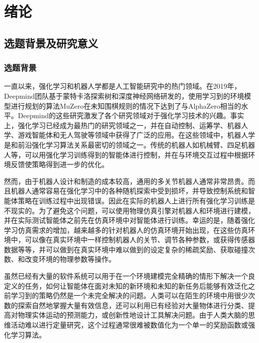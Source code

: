 \chapter{绪论}

    \section{选题背景及研究意义}
    
        \subsection{选题背景}
        一直以来，强化学习和机器人学都是人工智能研究中的热门领域。在2019年，Deepmind团队基于蒙特卡洛探索树和深度神经网络研发的，使用学习到的环境模型进行规划的算法MuZero在未知围棋规则的情况下达到了与AlphaZero相当的水平\cite{DBLP:journals/corr/abs-1911-08265, silver2018a}。Deepmind的这些研究激发了各个研究领域对于强化学习技术的兴趣。事实上，强化学习已经成为最热门的研究领域之一，并在自动控制、运筹学、机器人学、游戏智能体和无人驾驶等领域中获得了广泛的应用\cite{dosovitskiy2017carla}。在这些领域中，机器人学是和前沿强化学习算法关系最密切的领域之一。传统的机器人如机械臂、四足机器人等，可以用强化学习训练得到的智能体进行控制，并在与环境交互过程中根据环境反馈使策略得到进一步的优化。

        然而，由于机器人设计和制造的成本较高，通用的多关节机器人通常非常昂贵。而且机器人通常容易在强化学习中的各种随机探索中受到损坏，并导致控制系统和智能体策略在训练过程中出现错误。因此在实际的机器人上进行所有强化学习训练是不现实的\cite{toussaint2018differentiable, todorov2012mujoco}。为了避免这个问题，可以使用物理仿真引擎对机器人和环境进行建模，并在实际测试智能体之前先在仿真环境中对智能体进行训练。幸运的是，随着强化学习仿真需求的增加，越来越多的针对机器人的仿真环境开始出现，在这些仿真环境中，可以像在真实环境中一样控制机器人的关节、调节各种参数，或获得传感器数据等等，并可以做到在真实环境中难以做到的设定复杂的稀疏奖励、获取碰撞次数、和改变环境的物理参数等操作\cite{savva2019habitat}。

        虽然已经有大量的软件系统可以用于在一个环境建模完全精确的情形下解决一个良定义的任务\cite{toussaint2018differentiable}，如何让智能体在面对未知的新环境和未知的新任务后能够有效泛化之前学习到的策略仍然是一个未完全解决的问题\cite{DBLP:journals/corr/abs-1803-11347,DBLP:journals/corr/abs-1905-04819}。人类可以在陌生的环境中用很少次数的探索自然地掌握大量有效信息，还可以利用已有经验对大量物体进行分类、提高对物理实体运动的预测能力，或创新性地设计工具解决问题。由于人类大脑的思维活动难以进行定量研究，这个过程通常很难被数值化为一个单一的奖励函数或强化学习算法。

